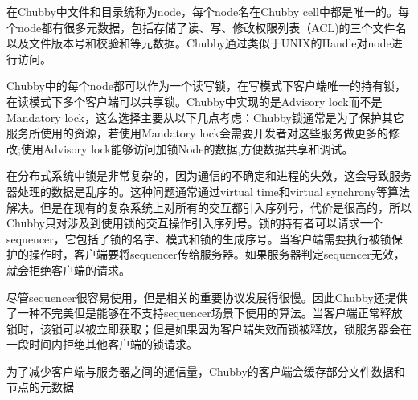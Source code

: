 \documentclass[UTF8]{article}
\begin{document}
	在Chubby中文件和目录统称为node，每个node名在Chubby cell中都是唯一的。每个node都有很多元数据，包括存储了读、写、修改权限列表（ACL)的三个文件名以及文件版本号和校验和等元数据。Chubby通过类似于UNIX的Handle对node进行访问。

	Chubby中的每个node都可以作为一个读写锁，在写模式下客户端唯一的持有锁，在读模式下多个客户端可以共享锁。Chubby中实现的是Advisory lock而不是Mandatory lock，这么选择主要从以下几点考虑：Chubby锁通常是为了保护其它服务所使用的资源，若使用Mandatory lock会需要开发者对这些服务做更多的修改;使用Advisory lock能够访问加锁Node的数据,方便数据共享和调试。
	
	在分布式系统中锁是非常复杂的，因为通信的不确定和进程的失效，这会导致服务器处理的数据是乱序的。这种问题通常通过virtual time和virtual synchrony等算法解决。但是在现有的复杂系统上对所有的交互都引入序列号，代价是很高的，所以Chubby只对涉及到使用锁的交互操作引入序列号。锁的持有者可以请求一个sequencer，它包括了锁的名字、模式和锁的生成序号。当客户端需要执行被锁保护的操作时，客户端要将sequencer传给服务器。如果服务器判定sequencer无效，就会拒绝客户端的请求。

	尽管sequencer很容易使用，但是相关的重要协议发展得很慢。因此Chubby还提供了一种不完美但是能够在不支持sequencer场景下使用的算法。当客户端正常释放锁时，该锁可以被立即获取；但是如果因为客户端失效而锁被释放，锁服务器会在一段时间内拒绝其他客户端的锁请求。
	
	为了减少客户端与服务器之间的通信量，Chubby的客户端会缓存部分文件数据和节点的元数据
	


	
\end{document}
